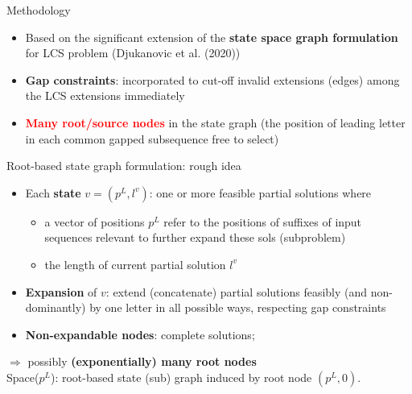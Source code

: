 \documentclass{beamer}
\begin{document}
\begin{frame}{Methodology}
    \begin{itemize}
        \item Based on the significant extension of the \textbf{state space graph formulation} for LCS problem  (Djukanovic et al. (2020)) \vspace{0.3cm}
        \item \textbf{Gap constraints}: incorporated to cut-off invalid extensions (edges) among the LCS extensions immediately \vspace{0.3cm}
        \item \textcolor{red}{\textbf{Many root/source nodes}} in the state graph (the position of leading letter in each common gapped subsequence free to select)
    \end{itemize}
    
\end{frame}


\begin{frame}{Root-based state graph formulation: rough idea}
  
  
  \begin{itemize}
      
      
      \item Each \textbf{state} $v=(p^L, l^v)$: one or more feasible partial solutions where
      \begin{itemize}
      	  \item  a vector of positions $p^L$ refer to the positions of suffixes of input sequences relevant to  further expand these sols (subproblem)
      	  \item the  length of current partial solution $l^v$ 
      \end{itemize}\vspace{0.3cm}
      \item \textbf{Expansion} of $v$: extend (concatenate)  partial solutions feasibly (and non-dominantly) by one letter  in all possible ways,  respecting gap constraints \vspace{0.3cm}
      \item \textbf{Non-expandable nodes}: complete solutions; 
  \end{itemize} \vspace{0.15cm}
  
   $\Rightarrow$ possibly \textbf{(exponentially) many root nodes}  \\ \vspace{0.2cm} {Space($p^L$)}: root-based state (sub) graph  induced by root node $(p^L, 0)$.
\end{frame}
\end{document}
